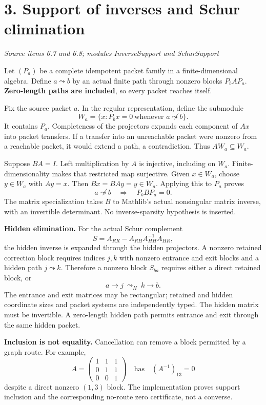 \documentclass[11pt]{article}
\newcommand{\pageheading}[2]{\section*{\color{ink}#1}\textit{#2}\par}
\begin{document}
\newpage
\pageheading{3. Support of inverses and Schur elimination}{Source items 6.7 and 6.8; modules InverseSupport and SchurSupport}
Let $(P_a)$ be a complete idempotent packet family in a finite-dimensional algebra. Define $a\leadsto b$ by an actual finite path through nonzero blocks $P_bAP_a$. \textbf{Zero-length paths are included}, so every packet reaches itself.

Fix the source packet $a$. In the regular representation, define the submodule
\[
W_a=\{x:P_bx=0\ \text{whenever }a\not\leadsto b\}.
\]
It contains $P_a$. Completeness of the projectors expands each component of $Ax$ into packet transfers. If a transfer into an unreachable packet were nonzero from a reachable packet, it would extend a path, a contradiction. Thus $AW_a\subseteq W_a$.

Suppose $BA=I$. Left multiplication by $A$ is injective, including on $W_a$. Finite-dimensionality makes that restricted map surjective. Given $x\in W_a$, choose $y\in W_a$ with $Ay=x$. Then $Bx=BAy=y\in W_a$. Applying this to $P_a$ proves
\[
\boxed{a\not\leadsto b\quad\Longrightarrow\quad P_bBP_a=0.}
\]
The matrix specialization takes $B$ to Mathlib's actual nonsingular matrix inverse, with an invertible determinant. No inverse-sparsity hypothesis is inserted.

\textbf{Hidden elimination.} For the actual Schur complement
\[
S=A_{RR}-A_{RH}A_{HH}^{-1}A_{HR},
\]
the hidden inverse is expanded through the hidden projectors. A nonzero retained correction block requires indices $j,k$ with nonzero entrance and exit blocks and a hidden path $j\leadsto k$. Therefore a nonzero block $S_{ba}$ requires either a direct retained block, or
\[
a\longrightarrow j\ \leadsto_{H}\ k\longrightarrow b.
\]
The entrance and exit matrices may be rectangular; retained and hidden coordinate sizes and packet systems are independently typed. The hidden matrix must be invertible. A zero-length hidden path permits entrance and exit through the same hidden packet.

\textbf{Inclusion is not equality.} Cancellation can remove a block permitted by a graph route. For example,
\[
A=\begin{pmatrix}1&1&1\\0&1&1\\0&0&1\end{pmatrix}
\quad\text{has}\quad (A^{-1})_{13}=0
\]
despite a direct nonzero $(1,3)$ block. The implementation proves support inclusion and the corresponding no-route zero certificate, not a converse.
\end{document}
